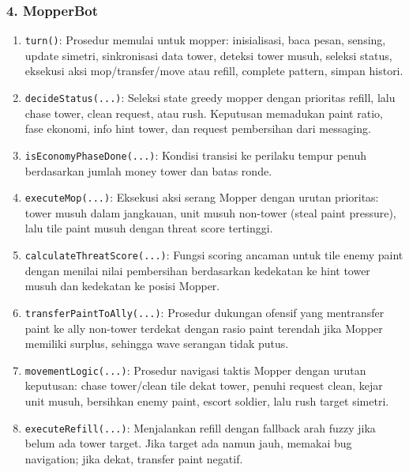 \subsubsection{4. MopperBot}
\begin{enumerate}
	\item \texttt{turn()}:
	      Prosedur memulai untuk mopper: inisialisasi, baca pesan, sensing, update simetri, sinkronisasi data tower, deteksi tower musuh, seleksi status, eksekusi aksi mop/transfer/move atau refill, complete pattern, simpan histori.

	\item \texttt{decideStatus(...)}:
	      Seleksi state greedy mopper dengan prioritas refill, lalu chase tower, clean request, atau rush. Keputusan memadukan paint ratio, fase ekonomi, info hint tower, dan request pembersihan dari messaging.

	\item \texttt{isEconomyPhaseDone(...)}:
	      Kondisi transisi ke perilaku tempur penuh berdasarkan jumlah money tower dan batas ronde.

	\item \texttt{executeMop(...)}:
	      Eksekusi aksi serang Mopper dengan urutan prioritas: tower musuh dalam jangkauan, unit musuh non-tower (steal paint pressure), lalu tile paint musuh dengan threat score tertinggi.

	\item \texttt{calculateThreatScore(...)}:
	      Fungsi scoring ancaman untuk tile enemy paint dengan menilai nilai pembersihan berdasarkan kedekatan ke hint tower musuh dan kedekatan ke posisi Mopper.

	\item \texttt{transferPaintToAlly(...)}:
	      Prosedur dukungan ofensif yang mentransfer paint ke ally non-tower terdekat dengan rasio paint terendah jika Mopper memiliki surplus, sehingga wave serangan tidak putus.

	\item \texttt{movementLogic(...)}:
	      Prosedur navigasi taktis Mopper dengan urutan keputusan: chase tower/clean tile dekat tower, penuhi request clean, kejar unit musuh, bersihkan enemy paint, escort soldier, lalu rush target simetri.

	\item \texttt{executeRefill(...)}:
	      Menjalankan refill dengan fallback arah fuzzy jika belum ada tower target. Jika target ada namun jauh, memakai bug navigation; jika dekat, transfer paint negatif.


\end{enumerate}

